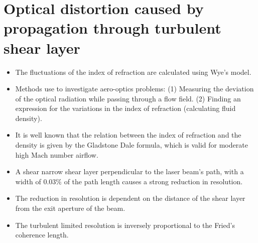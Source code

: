     \section{Optical distortion caused by propagation through turbulent shear layer \cite{pade:spie:2003}} 
        \begin{itemize} 
            \item The fluctuations of the index of refraction are calculated using Wye's model.
            \item Methods use to investigate aero-optics problems: (1) Measuring the deviation of the optical radiation while passing through a flow field. (2) Finding an expression for the variations in the index of refraction (calculating fluid density). 
            \item It is well known that the relation between the index of refraction and the density is given by the Gladstone Dale formula, which is valid for moderate high Mach number airflow.   
            \item A shear narrow shear layer perpendicular to the laser beam's path, with a width of $0.03\%$ of the path length causes a strong reduction in resolution.
            \item The reduction in resolution is dependent on the distance of the shear layer from the exit aperture of the beam. 
            \item The turbulent limited resolution is inversely proportional to the Fried's coherence length.
        \end{itemize}


